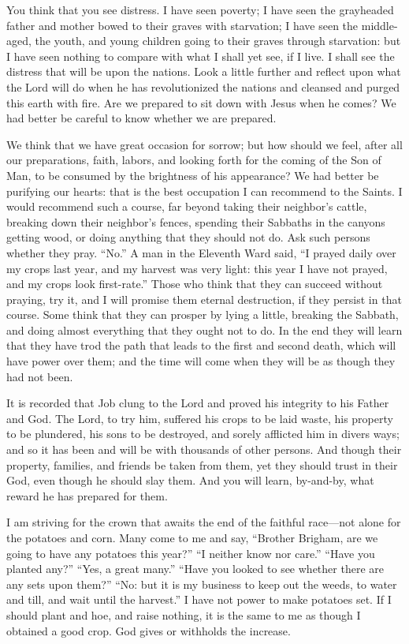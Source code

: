 					You think that you see distress. I have seen poverty; I have seen the grayheaded father and mother bowed to their graves with starvation; I have seen the middle-aged, the youth, and young children going to their graves through starvation: but I have seen nothing to compare with what I shall yet see, if I live. I shall see the distress that will be upon the nations. Look a little further and reflect upon what the Lord will do when he has revolutionized the nations and cleansed and purged this earth with fire. Are we prepared to sit down with Jesus when he comes? We had better be careful to know whether we are prepared.

					We think that we have great occasion for sorrow; but how should we feel, after all our preparations, faith, labors, and looking forth for the coming of the Son of Man, to be consumed by the brightness of his appearance? We had better be purifying our hearts: that is the best occupation I can recommend to the Saints. I would recommend such a course, far beyond taking their neighbor's cattle, breaking down their neighbor's fences, spending their Sabbaths in the canyons getting wood, or doing anything that they should not do. Ask such persons whether they pray. ``No.'' A man in the Eleventh Ward said, ``I prayed daily over my crops last year, and my harvest was very light: this year I have not prayed, and my crops look first-rate.'' Those who think that they can succeed without praying, try it, and I will promise them eternal destruction, if they persist in that course. Some think that they can prosper by lying a little, breaking the Sabbath, and doing almost everything that they ought not to do. In the end they will learn that they have trod the path that leads to the first and second death, which will have power over them; and the time will come when they will be as though they had not been.

					It is recorded that Job clung to the Lord and proved his integrity to his Father and God. The Lord, to try him, suffered his crops to be laid waste, his property to be plundered, his sons to be destroyed, and sorely afflicted him in divers ways; and so it has been and will be with thousands of other persons. And though their property, families, and friends be taken from them, yet they should trust in their God, even though he should slay them. And you will learn, by-and-by, what reward he has prepared for them.

					I am striving for the crown that awaits the end of the faithful race---not alone for the potatoes and corn. Many come to me and say, ``Brother Brigham, are we going to have any potatoes this year?'' ``I neither know nor care.'' ``Have you planted any?'' ``Yes, a great many.'' ``Have you looked to see whether there are any sets upon them?'' ``No: but it is my business to keep out the weeds, to water and till, and wait until the harvest.'' I have not power to make potatoes set. If I should plant and hoe, and raise nothing, it is the same to me as though I obtained a good crop. God gives or withholds the increase.

